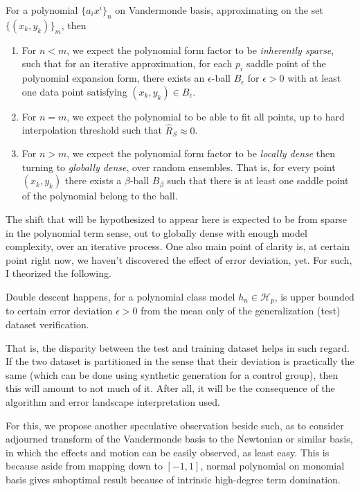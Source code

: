 \documentclass[10pt]{article}
\begin{document}
\begin{hypothesis}
For a polynomial $\{a_{i}x^{i}\}_{n}$ on Vandermonde basis, approximating on the set $\{(x_{k},y_{k})\}_{m}$, then
\begin{enumerate}[topsep=1.5pt,itemsep=1pt]
  \item For $n<m$, we expect the polynomial form factor to be \textit{inherently sparse}, such that for an iterative approximation, for each $p_{i}$ saddle point of the polynomial expansion form, there exists an $\epsilon$-ball $B_{\epsilon}$ for $\epsilon>0$ with at least one data point satisfying $(x_{k},y_{k})\in B_{\epsilon}$. 
  \item For $n=m$, we expect the polynomial to be able to fit all points, up to hard interpolation threshold such that $\hat{R}_{S}\approx 0$. 
  \item For $n>m$, we expect the polynomial form factor to be \textit{locally dense} then turning to \textit{globally dense}, over random ensembles. That is, for every point $(x_{k},y_{k})$ there exists a $\beta$-ball $B_{\beta}$ such that there is at least one saddle point of the polynomial belong to the ball. 
\end{enumerate}
\end{hypothesis}

The shift that will be hypothesized to appear here is expected to be from sparse in the polynomial term sense, out to globally dense with enough model complexity, over an iterative process. One also main point of clarity is, at certain point right now, we haven't discovered the effect of error deviation, yet. For such, I theorized the following. 

\begin{conjecture}
  Double descent happens, for a polynomial class model $h_{n}\in\mathcal{H}_{p}$, is upper bounded to certain error deviation $\epsilon>0$ from the mean only of the generalization (test) dataset verification. 
\end{conjecture}

That is, the disparity between the test and training dataset helps in such regard. If the two dataset is partitioned in the sense that their deviation is practically the same (which can be done using synthetic generation for a control group), then this will amount to not much of it. After all, it will be the consequence of the algorithm and error landscape interpretation used. 

For this, we propose another speculative observation beside such, as to consider adjourned transform of the Vandermonde basis to the Newtonian or similar basis, in which the effects and motion can be easily observed, as least easy. This is because aside from mapping down to $[-1,1]$, normal polynomial on monomial basis gives suboptimal result because of intrinsic high-degree term domination. 
\end{document}
